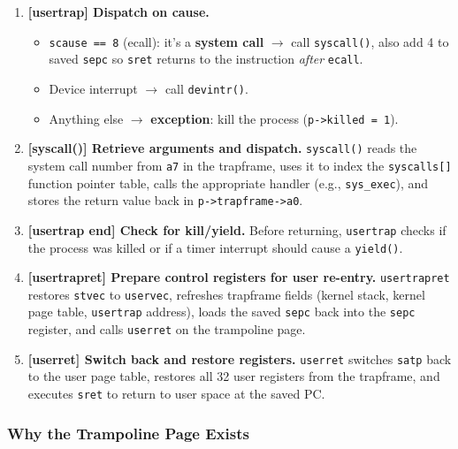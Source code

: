 \documentclass[11pt, a4paper]{article}
\begin{document}
\begin{tcolorbox}[lifecycle, title={User-Space Trap Lifecycle}]
\begin{enumerate}[leftmargin=1.8em, itemsep=0.3em]
  \item \textbf{[usertrap] Dispatch on cause.}
        \begin{itemize}[leftmargin=1.5em]
          \item \lstinline|scause == 8| (ecall): it's a \textbf{system call} $\to$ call \lstinline|syscall()|, also add 4 to saved \lstinline|sepc| so \lstinline|sret| returns to the instruction \emph{after} \lstinline|ecall|.
          \item Device interrupt $\to$ call \lstinline|devintr()|.
          \item Anything else $\to$ \textbf{exception}: kill the process (\lstinline|p->killed = 1|).
        \end{itemize}

  \item \textbf{[syscall()] Retrieve arguments and dispatch.}
        \lstinline|syscall()| reads the system call number from \lstinline|a7| in the trapframe, uses it to index the \lstinline|syscalls[]| function pointer table, calls the appropriate handler (e.g., \lstinline|sys_exec|), and stores the return value back in \lstinline|p->trapframe->a0|.

  \item \textbf{[usertrap end] Check for kill/yield.}
        Before returning, \lstinline|usertrap| checks if the process was killed or if a timer interrupt should cause a \lstinline|yield()|.

  \item \textbf{[usertrapret] Prepare control registers for user re-entry.}
        \lstinline|usertrapret| restores \lstinline|stvec| to \lstinline|uservec|, refreshes trapframe fields (kernel stack, kernel page table, \lstinline|usertrap| address), loads the saved \lstinline|sepc| back into the \lstinline|sepc| register, and calls \lstinline|userret| on the trampoline page.

  \item \textbf{[userret] Switch back and restore registers.}
        \lstinline|userret| switches \lstinline|satp| back to the user page table, restores all 32 user registers from the trapframe, and executes \lstinline|sret| to return to user space at the saved PC.

\end{enumerate}
\end{tcolorbox}

\subsubsection{Why the Trampoline Page Exists}
\end{document}
